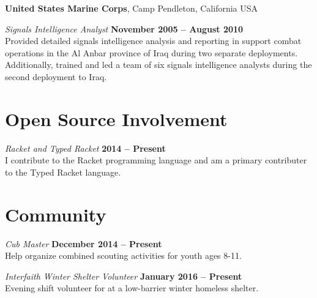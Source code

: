 \documentclass[margin,line]{res}
\begin{document}
\begin{resume}
{\bf United States Marine Corps}, Camp Pendleton, California USA

\vspace{-.3cm}
{\em Signals Intelligence Analyst} \hfill {\bf November 2005 -- August 2010}\\
Provided detailed signals intelligence analysis and reporting in
support combat operations in the Al Anbar province of Iraq during two
separate deployments. Additionally, trained and led a team of six
signals intelligence analysts during the second deployment to Iraq.

\section{\sc Open Source Involvement}

{\em Racket and Typed Racket} \hfill {\bf 2014 -- Present}\\ I
contribute to the Racket programming language and am a primary
contributer to the Typed Racket language.

\section{\sc Community}

{\em Cub Master} \hfill {\bf December 2014 -- Present}\\
Help organize combined scouting activities for youth ages 8-11.

\vspace{-.3cm} {\em Interfaith Winter Shelter Volunteer} \hfill {\bf
  January 2016 -- Present }\\ Evening shift volunteer for at a
low-barrier winter homeless shelter.


\end{resume}
\end{document}
